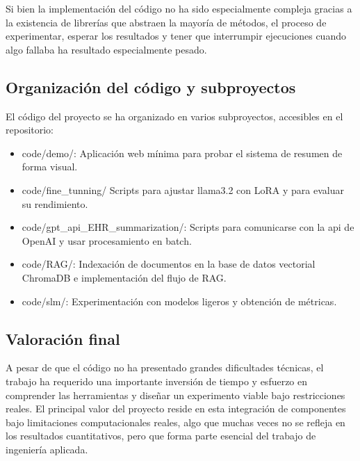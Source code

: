 	Si bien la implementación del código no ha sido especialmente compleja gracias a la existencia de librerías que abstraen la mayoría de métodos, el proceso de experimentar, esperar los resultados y tener que interrumpir ejecuciones cuando algo fallaba ha resultado especialmente pesado.
	
	\subsection{Organización del código y subproyectos}
	
	El código del proyecto se ha organizado en varios subproyectos, accesibles en el repositorio:
	
	\begin{itemize}
		\item code/demo/: Aplicación web mínima para probar el sistema de resumen de forma visual.
		\item code/fine\_tunning/ Scripts para ajustar llama3.2 con LoRA y para evaluar su rendimiento.
		\item code/gpt\_api\_EHR\_summarization/: Scripts para comunicarse con la api de OpenAI y usar procesamiento en batch.
		\item code/RAG/: Indexación de documentos en la base de datos vectorial ChromaDB e implementación del flujo de RAG.
		\item code/slm/: Experimentación con modelos ligeros y obtención de métricas.
	\end{itemize}
	
	\subsection{Valoración final}
	
	A pesar de que el código no ha presentado grandes dificultades técnicas, el trabajo ha requerido una importante inversión de tiempo y esfuerzo en comprender las herramientas y diseñar un experimento viable bajo restricciones reales. El principal valor del proyecto reside en esta integración de componentes bajo limitaciones computacionales reales, algo que muchas veces no se refleja en los resultados cuantitativos, pero que forma parte esencial del trabajo de ingeniería aplicada.
	
